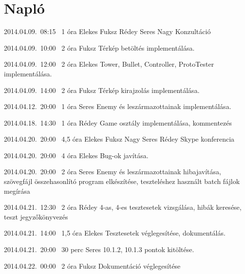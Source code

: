 %
\section{Napló}

\begin{naplo}

\bejegyzes
{2014.04.09.~08:15~}
{1 óra}
{Elekes\newline
Fuksz\newline
Rédey\newline
Seres\newline
Nagy}
{Konzultáció}

\bejegyzes
{2014.04.09.~10:00~}
{2 óra}
{Fuksz}
{Térkép betöltés implementálása.}

\bejegyzes
{2014.04.09.~12:00~}
{2 óra}
{Elekes}
{Tower, Bullet, Controller, ProtoTester implementálása.}

\bejegyzes
{2014.04.09.~14:00~}
{2 óra}
{Fuksz}
{Térkép kirajzolás implementálása.}

\bejegyzes
{2014.04.12.~20:00~}
{1 óra}
{Seres}
{Enemy és leszármazottainak implementálása.}

\bejegyzes
{2014.04.18.~14:30~}
{1 óra} 
{Rédey} 
{Game osztály implementálása, kommentezés}

\bejegyzes
{2014.04.20.~20:00~} 
{4,5 óra}
{Elekes\newline
Fuksz\newline
Nagy\newline
Seres\newline
Rédey}
{Skype konferencia}

\bejegyzes
{2014.04.20.~20:00~}
{4 óra}
{Elekes}
{Bug-ok javítása.}

\bejegyzes
{2014.04.20.~20:00~}
{2 óra}
{Seres}
{Enemy és leszármazottainak hibajavítása, szövegfájl összehasonlító program elkészítése, teszteléshez használt batch fájlok megírása}

\bejegyzes
{2014.04.21.~12:30~} 
{2 óra}
{Rédey}
{4-as, 4-es tesztesetek vizsgálása, hibák keresése, teszt jegyzőkönyvezés}

\bejegyzes
{2014.04.21.~14:00~}
{1,5 óra}
{Elekes}
{Tesztesetek véglegesítése, dokumentálás.}

\bejegyzes
{2014.04.21.~20:00~}
{30 perc}
{Seres}
{10.1.2, 10.1.3 pontok kitöltése.}

\bejegyzes
{2014.04.22.~00:00~}
{2 óra}
{Fuksz}
{Dokumentáció véglegesítése}


\end{naplo}

